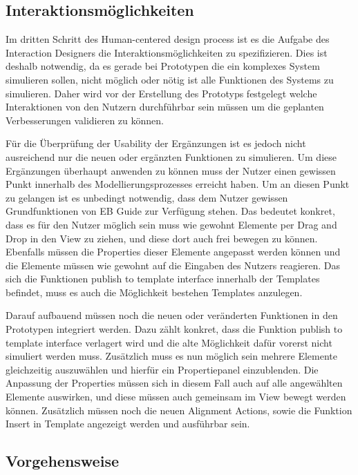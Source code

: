 \subsection{Interaktionsmöglichkeiten}

Im dritten Schritt des Human-centered design process ist es die Aufgabe des Interaction Designers die Interaktionsmöglichkeiten zu spezifizieren.
Dies ist deshalb notwendig, da es gerade bei Prototypen die ein komplexes System simulieren sollen, nicht möglich oder nötig ist alle Funktionen des Systems zu simulieren.
Daher wird vor der Erstellung des Prototyps festgelegt welche Interaktionen von den Nutzern durchführbar sein müssen um die geplanten Verbesserungen validieren zu können.

Für die Überprüfung der Usability der Ergänzungen ist es jedoch nicht ausreichend nur die neuen oder ergänzten Funktionen zu simulieren.
Um diese Ergänzungen überhaupt anwenden zu können muss der Nutzer einen gewissen Punkt innerhalb des Modellierungsprozesses erreicht haben.
Um an diesen Punkt zu gelangen ist es unbedingt notwendig, dass dem Nutzer gewissen Grundfunktionen von EB Guide zur Verfügung stehen.
Das bedeutet konkret, dass es für den Nutzer möglich sein muss wie gewohnt Elemente per Drag and Drop in den View zu ziehen, und diese dort auch frei bewegen zu können.
Ebenfalls müssen die Properties dieser Elemente angepasst werden können und die Elemente müssen wie gewohnt auf die Eingaben des Nutzers reagieren.
Das sich die Funktionen \glqq publish to template interface\grqq{} innerhalb der Templates befindet, muss es auch die Möglichkeit bestehen Templates anzulegen.

Darauf aufbauend müssen noch die neuen oder veränderten Funktionen in den Prototypen integriert werden.
Dazu zählt konkret, dass die Funktion \glqq publish to template interface\grqq{} verlagert wird und die alte Möglichkeit dafür vorerst nicht simuliert werden muss.
Zusätzlich muss es nun möglich sein mehrere Elemente gleichzeitig auszuwählen und hierfür ein Propertiepanel einzublenden.
Die Anpassung der Properties müssen sich in diesem Fall auch auf alle angewählten Elemente auswirken, und diese müssen auch gemeinsam im View bewegt werden können.
Zusätzlich müssen noch die neuen Alignment Actions, sowie die Funktion Insert in Template angezeigt werden und ausführbar sein.

\subsection{Vorgehensweise}

